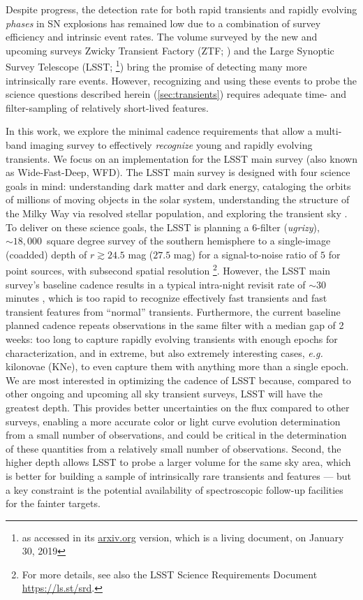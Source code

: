 \documentclass[letterpaper,longauthor,trackchanges,twocolumn,onecolappendix,sort&compress]{aastex62}
\begin{document}

Despite progress, the detection rate for both rapid transients and rapidly evolving \emph{phases} in SN explosions has remained low due to a combination of survey efficiency and intrinsic event rates. The volume surveyed by the new and upcoming surveys Zwicky Transient Factory (ZTF; \citealt{ztf}) and the Large Synoptic Survey Telescope (LSST; \citealt{lsst}\footnote{as accessed in its \url{arxiv.org} version, which is a living document, on January 30, 2019}) bring the promise of detecting many more intrinsically rare events. However, recognizing and using these events to probe the science questions described herein (\autoref{sec:transients}) requires adequate time- and filter-sampling of relatively short-lived features. 

In this work, we explore the minimal cadence requirements that allow a multi-band imaging survey to effectively \emph{recognize} young and rapidly evolving transients. We focus on an implementation for the LSST main survey (also known as Wide-Fast-Deep, WFD). The LSST main survey is designed with four science goals in mind: understanding dark matter and dark energy, cataloging the orbits of millions of moving objects in the solar system, understanding the structure of the Milky Way via resolved stellar population, and exploring the transient sky \citep{lsst}. To deliver on these science goals, the LSST is planning a 6-filter (\emph{ugrizy}), $\sim18,000$~square degree survey of the southern hemisphere to a single-image (coadded) depth of $r\gtrsim24.5$ mag ($27.5$ mag) for a signal-to-noise ratio of $5$ for point sources, with subsecond spatial resolution \citep{lsst}\footnote{For more details, see also the LSST Science Requirements Document \url{https://ls.st/srd}.}. However, the LSST main survey's baseline cadence results in a typical intra-night revisit rate of $\sim$30 minutes \citep{COSEP}, which is too rapid to recognize effectively fast transients and fast transient features from ``normal'' transients. Furthermore, the current baseline planned cadence repeats observations in the same filter with a median gap of 2 weeks: too long to capture rapidly evolving transients with enough epochs for characterization, and in extreme, but also extremely interesting cases, \emph{e.g.} kilonovae (KNe), to even capture them with anything more than a single epoch. We are most interested in optimizing the cadence of LSST because, compared to other ongoing and upcoming all sky transient surveys, LSST will have the greatest depth. This provides better uncertainties on the flux compared to other surveys, enabling a more accurate color or  light curve evolution determination from a small number of observations, and could be critical in the determination of these quantities from a relatively small number of observations. Second, the higher depth allows LSST to probe a larger volume for the same sky area, which is better for building a sample of intrinsically rare transients and features --- but a key constraint is the potential availability of spectroscopic follow-up facilities for the fainter targets.
\end{document}
